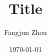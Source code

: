 \documentclass[12pt]{article}
\author{Fangjun Zhou}
\title{Title}
\date{\today}
\begin{document}
\maketitle

\blindtext
\end{document}
